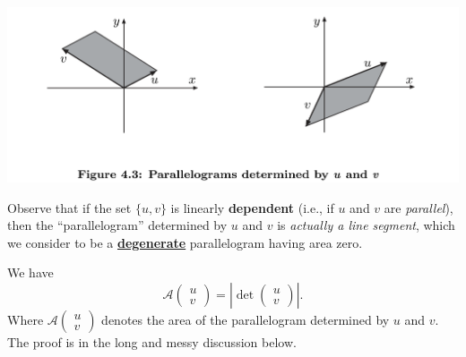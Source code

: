 \includegraphics[width=16cm]{images/figure-4-3.png}

\begin{remark} \label{remark 4.1.4}
Observe that if the set \(\{ u, v \}\) is linearly \textbf{dependent} (i.e., if \(u\) and \(v\) are \emph{parallel}),
then the ``parallelogram'' determined by \(u\) and \(v\) is \emph{actually a line segment}, which we consider to be a
\href{https://www.wikiwand.com/en/Degeneracy_(mathematics)}{\textbf{degenerate}} parallelogram having area zero.
\end{remark}

\begin{additional theorem} \label{athm 4.1}
We have
\[
    \mathcal{A}\begin{pmatrix} u \\ v \end{pmatrix}
    = \left| \det \begin{pmatrix} u \\ v \end{pmatrix} \right|.
\]
Where \(\mathcal{A}\begin{pmatrix} u \\ v \end{pmatrix}\) denotes the area of the parallelogram determined by \(u\) and \(v\).
The proof is in the long and messy discussion below.
\end{additional theorem}

